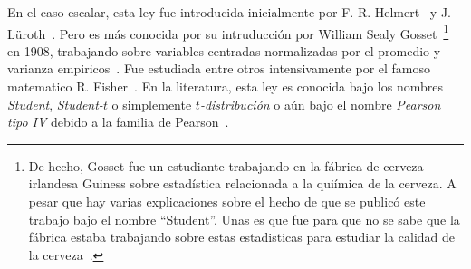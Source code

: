 \label{Sssec:MP:Student}

En   el  caso   escalar,  esta   ley   fue  introducida   inicialmente  por   F.
R. Helmert~\cite{Hel75, Hel76, She95}  y J.  L\"uroth~\cite{Lur76, Pfa96}.  Pero
es m\'as  conocida por su  intruducci\'on por William  Sealy Gosset~\footnote{De
  hecho,  Gosset  fue  un  estudiante  trabajando en  la  f\'abrica  de  cerveza
  irlandesa  Guiness  sobre estad\'istica  relacionada  a  la  qui\'imica de  la
  cerveza.   A pesar  que hay  varias  explicaciones sobre  el hecho  de que  se
  public\'o este trabajo bajo el nombre ``Student''. Unas es que fue para que no
  se  sabe que  la f\'abrica  estaba  trabajando sobre  estas estadisticas  para
  estudiar la  calidad de la  cerveza~\cite{Wen16}.}  en 1908,  trabajando sobre
variables    centradas    normalizadas    por    el    promedio    y    varianza
empiricos~\cite{Stu08}.  Fue estudiada entre  otros intensivamente por el famoso
matematico R. Fisher~\cite{Fis25}.  En la  literatura, esta ley es conocida bajo
los   nombres   {\em   Student},    {\em   Student-$t$}   o   simplemente   {\em
  $t$-distribuci\'on} o a\'un  bajo el nombre {\em Pearson tipo  IV} debido a la
familia de Pearson~\cite{Pea95}.


